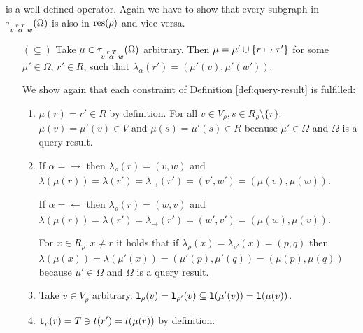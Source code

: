 \begin{definition}
\begin{proofof}{ is a well-defined operator.}
Again we have to show that every subgraph in
$\tau\!_{v\, \overset{r:T}{\alpha} \, w}(\Omega)$ is also in $\text{res}(\rho)$ and vice
versa.

\begin{itemize}
  \item[$(\subseteq)$]
    Take $\mu \in \tau\!_{v\, \overset{r:T}{\alpha} \, w}(\Omega)$ arbitrary.
    Then $\mu = \mu' \cup \{ r \mapsto r' \}$ for some $\mu' \in \Omega$,
    $r' \in R$, such that $\lambda_\alpha(r') = (\mu'(v), \mu'(w'))$.
    
    We show again that each constraint of Definition \ref{def:query-result} is
    fulfilled:
    \begin{enumerate}[(1)]
      \item %
        $\mu(r) = r' \in R$ by definition.
        For all $v \in V_\rho, s \in R_\rho \setminus \{r\}$:
        $\mu(v) = \mu'(v) \in V$ and $\mu(s) = \mu'(s) \in R$ because
        $\mu' \in \Omega$ and $\Omega$ is a query result.
      \item %
        If $\alpha = \rightarrow$
        then $\lambda_\rho(r) = (v, w)$
        and $\lambda(\mu(r)) = \lambda(r') = \lambda_\rightarrow(r')
                             = (v', w') = (\mu(v), \mu(w))$.
        
        If $\alpha = \leftarrow$
        then $\lambda_\rho(r) = (w, v)$
        and $\lambda(\mu(r)) = \lambda(r') = \lambda_\rightarrow(r')
                             = (w', v') = (\mu(w), \mu(v))$.
        
        For $x \in R_\rho, x \not = r$ it holds that if
        $\lambda_\rho(x) = \lambda_{\rho'}(x) = (p, q)$
        then $\lambda(\mu(x)) = \lambda(\mu'(x))
                              = (\mu'(p), \mu'(q)) = (\mu(p), \mu(q))$
        because $\mu' \in \Omega$ and $\Omega$ is a query result.
        
      \item %
        Take $v \in V_\rho$ arbitrary.
        $\texttt{l}_\rho(v) = \texttt{l}_{\rho'}(v) \subseteq \texttt{l}(\mu'(v))
                         = \texttt{l}(\mu(v))$.
      
      \item %
        $\texttt{t}_\rho(r) = T \ni t(r') = t(\mu(r))$ by definition.
        

\end{enumerate}
\end{itemize}
\end{proofof}
\end{definition}
